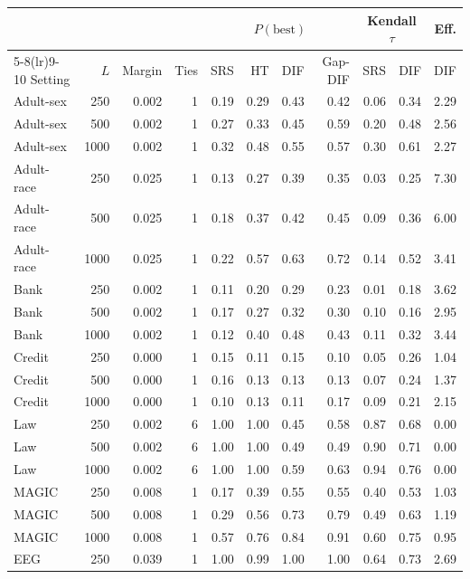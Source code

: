 \begin{tabular}{lrrrrrrrrrr}
\toprule
 & & & & \multicolumn{4}{c}{$P(\mathrm{best})$} & \multicolumn{2}{c}{Kendall $\tau$} & Eff. \\
\cmidrule(lr){5-8}\cmidrule(lr){9-10}
Setting & $L$ & Margin & Ties & SRS & HT & DIF & Gap-DIF & SRS & DIF & DIF \\
\midrule
Adult-sex & 250 & 0.002 & 1 & 0.19 & 0.29 & 0.43 & 0.42 & 0.06 & 0.34 & 2.29 \\
Adult-sex & 500 & 0.002 & 1 & 0.27 & 0.33 & 0.45 & 0.59 & 0.20 & 0.48 & 2.56 \\
Adult-sex & 1000 & 0.002 & 1 & 0.32 & 0.48 & 0.55 & 0.57 & 0.30 & 0.61 & 2.27 \\
Adult-race & 250 & 0.025 & 1 & 0.13 & 0.27 & 0.39 & 0.35 & 0.03 & 0.25 & 7.30 \\
Adult-race & 500 & 0.025 & 1 & 0.18 & 0.37 & 0.42 & 0.45 & 0.09 & 0.36 & 6.00 \\
Adult-race & 1000 & 0.025 & 1 & 0.22 & 0.57 & 0.63 & 0.72 & 0.14 & 0.52 & 3.41 \\
Bank & 250 & 0.002 & 1 & 0.11 & 0.20 & 0.29 & 0.23 & 0.01 & 0.18 & 3.62 \\
Bank & 500 & 0.002 & 1 & 0.17 & 0.27 & 0.32 & 0.30 & 0.10 & 0.16 & 2.95 \\
Bank & 1000 & 0.002 & 1 & 0.12 & 0.40 & 0.48 & 0.43 & 0.11 & 0.32 & 3.44 \\
Credit & 250 & 0.000 & 1 & 0.15 & 0.11 & 0.15 & 0.10 & 0.05 & 0.26 & 1.04 \\
Credit & 500 & 0.000 & 1 & 0.16 & 0.13 & 0.13 & 0.13 & 0.07 & 0.24 & 1.37 \\
Credit & 1000 & 0.000 & 1 & 0.10 & 0.13 & 0.11 & 0.17 & 0.09 & 0.21 & 2.15 \\
Law & 250 & 0.002 & 6 & 1.00 & 1.00 & 0.45 & 0.58 & 0.87 & 0.68 & 0.00 \\
Law & 500 & 0.002 & 6 & 1.00 & 1.00 & 0.49 & 0.49 & 0.90 & 0.71 & 0.00 \\
Law & 1000 & 0.002 & 6 & 1.00 & 1.00 & 0.59 & 0.63 & 0.94 & 0.76 & 0.00 \\
MAGIC & 250 & 0.008 & 1 & 0.17 & 0.39 & 0.55 & 0.55 & 0.40 & 0.53 & 1.03 \\
MAGIC & 500 & 0.008 & 1 & 0.29 & 0.56 & 0.73 & 0.79 & 0.49 & 0.63 & 1.19 \\
MAGIC & 1000 & 0.008 & 1 & 0.57 & 0.76 & 0.84 & 0.91 & 0.60 & 0.75 & 0.95 \\
EEG & 250 & 0.039 & 1 & 1.00 & 0.99 & 1.00 & 1.00 & 0.64 & 0.73 & 2.69 \\

\end{tabular}
